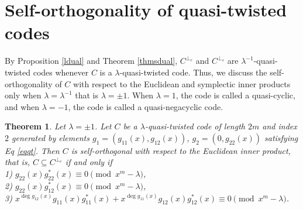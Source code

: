 \documentclass[12 pt]{extarticle}
\numberwithin{equation}{section}
\newtheorem{theorem}{Theorem}[section]
\theoremstyle{definition}
\begin{document}
 \section{Self-orthogonality of quasi-twisted codes}\label{selfdualcodes}
By Proposition \ref{ldual} and  Theorem \ref{thmsdual}, $C^{\perp_e}$ and $C^{\perp_s}$ are $\lambda^{-1}$-quasi-twisted codes whenever $C$ is a $\lambda$-quasi-twisted code. Thus, we discuss the self-orthogonality of $C$ with respect to the Euclidean and symplectic inner products only when $\lambda=\lambda^{-1}$ that is $\lambda=\pm 1$. When $\lambda=1$, the code is called a quasi-cyclic, and when $\lambda=-1$, the code is called a quasi-negacyclic code.
\begin{theorem}\label{selforthogonaleuclidean}
Let $\lambda=\pm 1$.  Let $C$ be a $\lambda$-quasi-twisted code of length $2m$ and index $2$ generated by elements $g_1=(g_{11}(x),g_{12}(x))$, $g_2=(0,g_{22}(x))$ satisfying Eq \ref{eqqt}. Then $C$ is self-orthogonal with respect to the Euclidean inner product, that is, $C\subseteq C^{\perp_e}$ if and only if \\
1)    $g_{22}(x)g_{22}^*(x)\equiv 0\pmod{x^m-\lambda}$,\\
 2)     $g_{22}(x)g_{12}^*(x)\equiv 0\pmod{x^m-\lambda}$,\\
 3)  $x^{\deg g_{12}(x)} g_{11}(x)g_{11}^*(x)+x^{\deg g_{11}(x)}g_{12}(x)g_{12}^*(x)\equiv 0\pmod{x^m-\lambda}$.
\end{theorem}
\end{document}
